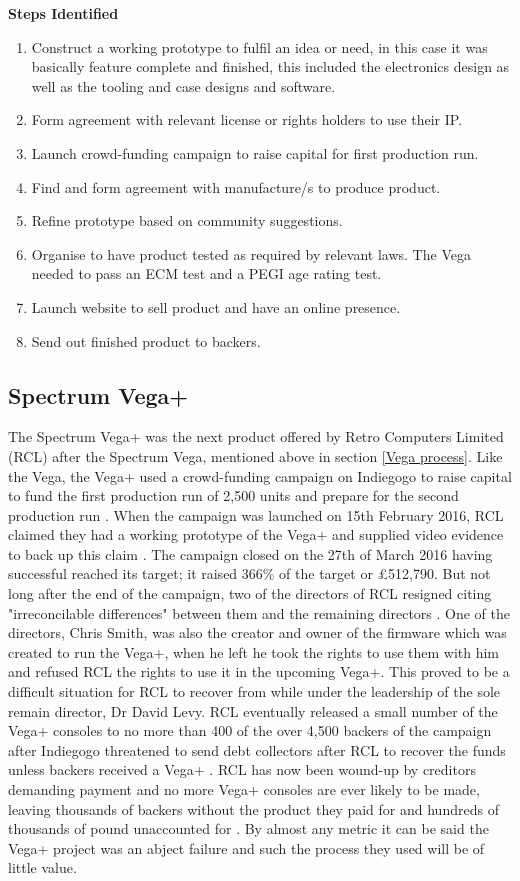 \textbf{Steps Identified}\\
\begin{enumerate}
\item Construct a working prototype to fulfil an idea or need, in this case it was basically feature complete and finished, this included the electronics design as well as the tooling and case designs and software. 
\item Form agreement with relevant license or rights holders to use their IP.
\item Launch crowd-funding campaign to raise capital for first production run.
\item Find and form agreement with manufacture/s to produce product.
\item Refine prototype based on community suggestions.
\item Organise to have product tested as required by relevant laws. The Vega needed to pass an ECM test and a PEGI age rating test.
\item Launch website to sell product and have an online presence.
\item Send out finished product to backers.
\end{enumerate} 



\subsection{Spectrum Vega+}
The Spectrum Vega+ was the next product offered by Retro Computers Limited (RCL) after the Spectrum Vega, mentioned above in section \ref{Vega process}. Like the Vega, the Vega+ used a crowd-funding campaign on Indiegogo to raise capital to fund the first production run of 2,500 units and prepare for the second production run 
\cite{RN143}. When the campaign was launched on 15th February 2016, RCL claimed they had a working prototype of the Vega+ and supplied video evidence to back up this claim 
\cite{RN145}\cite{RN143}. The campaign closed on the 27th of March 2016 having successful reached its target; it raised 366\% of the target or \pounds 512,790. 
But not long after the end of the campaign, two of the directors of RCL resigned citing "irreconcilable differences" between them and the remaining directors
\cite{RN146}. One of the directors, Chris Smith, was also the creator and owner of the firmware which was created to run the Vega+, when he left he took the rights to use them with him and refused RCL the rights to use it in the upcoming Vega+. This proved to be a difficult situation for RCL to recover from while under the leadership of the sole remain director, Dr David Levy. RCL eventually released a small number of the Vega+ consoles to no more than 400 of the over 4,500 backers of the campaign after Indiegogo threatened to send debt collectors after RCL to recover the funds unless backers received a Vega+ 
\cite{RN147}. RCL has now been wound-up by creditors demanding payment and no more Vega+ consoles are ever likely to be made, leaving thousands of backers without the product they paid for and hundreds of thousands of pound unaccounted for 
\cite{RN120}\cite{RN148}. By almost any metric it can be said the Vega+ project was an abject failure and such the process they used will be of little value. 

